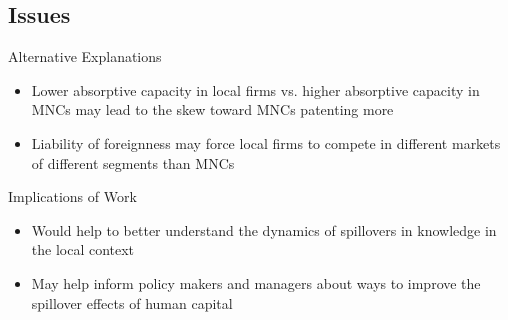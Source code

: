 \documentclass{beamer}
\begin{document}
\subsection{Issues}
\begin{frame}{Alternative Explanations}{}
\begin{itemize}
\item<1->{Lower absorptive capacity in local firms vs. higher absorptive capacity in MNCs may lead to the skew toward MNCs patenting more}
\item<2->{Liability of foreignness may force local firms to compete in different markets of different segments than MNCs}
\end{itemize}
\end{frame}

\begin{frame}{Implications of Work}{}
\begin{itemize}
\item<1->{Would help to better understand the dynamics of spillovers in knowledge in the local context}
\item<2->{May help inform policy makers and managers about ways to improve the spillover effects of human capital}
\end{itemize}
\end{frame}




\end{document}
